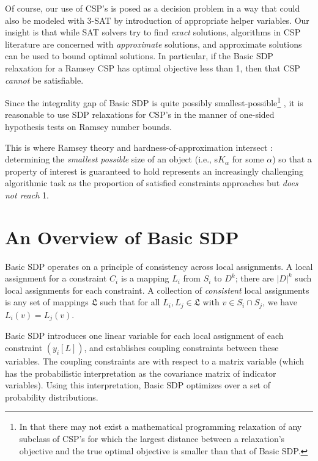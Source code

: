 \documentclass[12pt]{article} %
\begin{document}
Of course, our use of CSP's is posed as a decision problem in a way that could also be modeled with 3-SAT by introduction of appropriate helper variables. Our insight is that while SAT solvers try to find \textit{exact} solutions, algorithms in CSP literature are concerned with \textit{approximate} solutions, and approximate solutions can be used to bound optimal solutions. In particular, if the Basic SDP relaxation for a Ramsey CSP has optimal objective less than 1, then that CSP \textit{cannot} be satisfiable. 

Since the integrality gap of Basic SDP is quite possibly smallest-possible\footnote{In that there may not exist a mathematical programming relaxation of any subclass of CSP's for which the largest distance between a relaxation's objective and the true optimal objective is smaller than that of Basic SDP.} \cite{raghavendra2008optimal}, it is reasonable to use SDP relaxations for CSP's in the manner of one-sided hypothesis tests on Ramsey number bounds. 

This is where Ramsey theory and hardness-of-approximation intersect : determining the \textit{smallest possible} size of an object (i.e., s$K_{\alpha}$ for some $\alpha$) so that a property of interest is guaranteed to hold represents an increasingly challenging algorithmic task as the proportion of satisfied constraints approaches but \textit{does not reach} 1.

\section{An Overview of Basic SDP}

Basic SDP operates on a principle of consistency across local assignments. A local assignment for a constraint $C_i$ is a mapping $L_i$ from $S_i$ to $D^{k}$; there are $|D|^k$ such local assignments for each constraint. A collection of \textit{consistent} local assignments is any set of mappings $\mathfrak{L}$ such that for all $L_i, L_j \in \mathfrak{L}$ with $v \in S_i \cap S_j$, we have $L_i(v) = L_j(v)$.

Basic SDP introduces one linear variable for each local assignment of each constraint $(y_i[L])$, and establishes coupling constraints between these variables. The coupling constraints are with respect to a matrix variable (which has the probabilistic interpretation as the covariance matrix of indicator variables). Using this interpretation, Basic SDP optimizes over a set of probability distributions.
\end{document}
